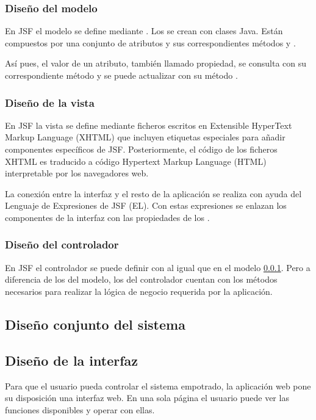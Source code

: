 
\subsubsection{Diseño del modelo} \label{sec:arch-modelo}
En JSF el modelo se define mediante . Los
 se crean con clases Java. Están compuestos por una
conjunto de atributos y sus correspondientes métodos 
 y .

Así pues, el valor de un atributo, también llamado propiedad, se consulta con
su correspondiente método  y se puede actualizar con su
método .

\subsubsection{Diseño de la vista} \label{sec:arch-vista}
En JSF la vista se define mediante ficheros escritos en Extensible HyperText
Markup Language (XHTML) que incluyen etiquetas especiales para añadir
componentes específicos de JSF. Posteriormente, el código de los ficheros XHTML
es traducido a código Hypertext Markup Language (HTML) interpretable por los
navegadores web.

La conexión entre la interfaz y el resto de la aplicación se realiza con ayuda
del Lenguaje de Expresiones de JSF (EL). Con estas expresiones se enlazan los
componentes de la interfaz con las propiedades de los .

\subsubsection{Diseño del controlador} \label{sec:arch-ctl}
En JSF el controlador se puede definir con  al igual
que en el modelo \ref{sec:arch-modelo}. Pero a diferencia de los
 del modelo, los  del controlador
cuentan con los métodos necesarios para realizar la lógica de negocio
requerida por la aplicación.


\subsection{Diseño conjunto del sistema} \label{sec:design-comp}


\subsection{Diseño de la interfaz} \label{sec:design-iface}
Para que el usuario pueda controlar el sistema empotrado, la aplicación web
pone su disposición una interfaz web. En una sola página el usuario puede
ver las funciones disponibles y operar con ellas.

